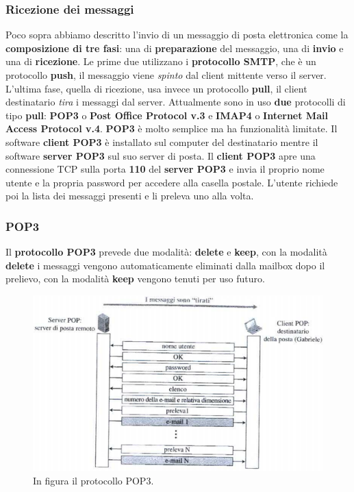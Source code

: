 \documentclass[11pt,a4paper,oneside]{book}
\theoremstyle{definition}
\begin{document}
\subsubsection{Ricezione dei messaggi}
Poco sopra abbiamo descritto l'invio di un messaggio di posta elettronica come la \textbf{composizione di tre fasi}: una di \textbf{preparazione} del messaggio, una di \textbf{invio} e una di \textbf{ricezione}. Le prime due utilizzano i \textbf{protocollo SMTP}, che è un protocollo \textbf{push}, il messaggio viene \textit{spinto} dal client mittente verso il server. L'ultima fase, quella di ricezione, usa invece un protocollo \textbf{pull}, il client destinatario \textit{tira} i messaggi dal server. Attualmente sono in uso \textbf{due} protocolli di tipo \textbf{pull}: \textbf{POP3} o \textbf{Post Office Protocol v.3} e \textbf{IMAP4} o \textbf{Internet Mail Access Protocol v.4}.
\textbf{POP3} è molto semplice ma ha funzionalità limitate. Il software \textbf{client POP3 } è installato sul computer del destinatario mentre il software \textbf{server POP3 }sul suo server di posta. Il \textbf{client POP3} apre una connessione TCP sulla porta \textbf{110} del \textbf{server POP3} e invia il proprio nome utente e la propria password per accedere alla casella postale. L'utente richiede poi la lista dei messaggi presenti e li preleva uno alla volta.

\pagebreak

\subsubsection{POP3}
Il \textbf{protocollo POP3} prevede due modalità: \textbf{delete} e \textbf{keep}, con la modalità \textbf{delete} i messaggi vengono automaticamente eliminati dalla mailbox dopo il prelievo, con la modalità \textbf{keep} vengono tenuti per uso futuro.
\begin{figure}[!h]
	\includegraphics[scale=0.6]{Immagini/POP3.png}
	\centering
	\caption{In figura il protocollo POP3.}
\end{figure}
\end{document}
